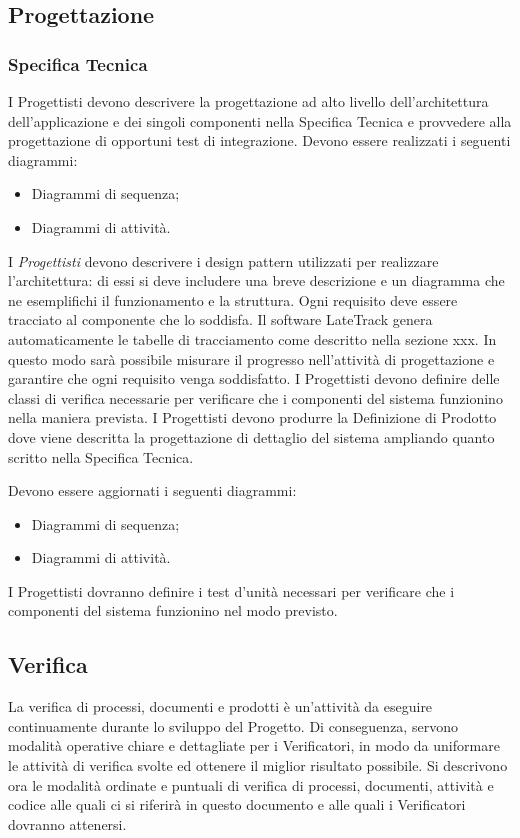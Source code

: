 {   \subsection{Progettazione}
	\subsubsection{Specifica Tecnica}
	I Progettisti devono descrivere la progettazione ad alto livello dell'architettura dell'applicazione e dei singoli componenti nella Specifica Tecnica e provvedere alla progettazione	di opportuni test di integrazione.
	Devono essere realizzati i seguenti diagrammi:
	\begin{itemize}
	\item Diagrammi di sequenza;
	\item Diagrammi di attività.
	\end{itemize}
	I \textit{Progettisti} devono descrivere i design pattern utilizzati per realizzare l'architettura:
	di essi si deve includere una breve descrizione e un diagramma che ne esemplifichi il funzionamento e la struttura.
	Ogni requisito deve essere tracciato al componente che lo soddisfa. Il software LateTrack genera automaticamente le tabelle di tracciamento come descritto nella sezione xxx. In questo modo sarà possibile misurare il progresso nell'attività di progettazione e garantire che ogni requisito venga soddisfatto.
	I Progettisti devono definire delle classi di verifica necessarie per verificare che i componenti del sistema funzionino nella maniera prevista.
	I Progettisti devono produrre la Definizione di Prodotto dove viene descritta la progettazione di dettaglio del sistema ampliando quanto scritto nella Specifica Tecnica.
	
	Devono essere aggiornati i seguenti diagrammi:
	\begin{itemize}

	\item Diagrammi di sequenza;
	\item Diagrammi di attività.
	\end{itemize}

	I Progettisti dovranno definire i test d'unità necessari per verificare che i componenti
	del sistema funzionino nel modo previsto.
	\subsection{Verifica}
	La verifica di processi, documenti e prodotti è un'attività da eseguire continuamente	durante lo sviluppo del Progetto. Di conseguenza, servono modalità operative chiare 	e dettagliate per i Verificatori, in modo da uniformare le attività di verifica svolte ed ottenere il miglior risultato possibile. Si descrivono ora le modalità ordinate e puntuali di verifica di processi, documenti, attività e codice alle quali ci si riferirà in questo documento e alle quali i Verificatori dovranno attenersi.
}
